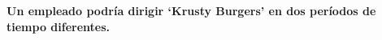 \textbf{Un empleado podría dirigir ‘Krusty Burgers’ en dos períodos de tiempo diferentes.}\vspace{.3cm}
